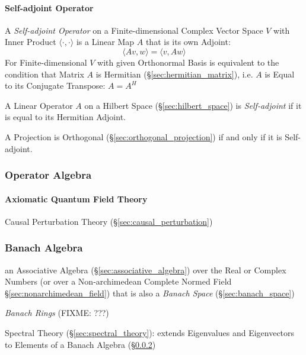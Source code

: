 \paragraph{Self-adjoint Operator}\label{sec:self_adjoint_operator}\hfill

A \emph{Self-adjoint Operator} on a Finite-dimensional Complex Vector Space $V$
with Inner Product $\langle{\cdot, \cdot}\rangle$ is a Linear Map $A$ that is
its own Adjoint:
\[
  \langle{Av,w}\rangle = \langle{v,Aw}\rangle
\]
For Finite-dimensional $V$ with given Orthonormal Basis is equivalent to the
condition that Matrix $A$ is Hermitian (\S\ref{sec:hermitian_matrix}), i.e. $A$
is Equal to its Conjugate Transpose: $A = A^H$

A Linear Operator $A$ on a Hilbert Space (\S\ref{sec:hilbert_space}) is
\emph{Self-adjoint} if it is equal to its Hermitian Adjoint.

A Projection is Orthogonal (\S\ref{sec:orthogonal_projection}) if and only if
it is Self-adjoint.



\subsubsection{Operator Algebra}\label{sec:operator_algebra}

\paragraph{Axiomatic Quantum Field Theory}\label{sec:axiomatic_qft}\hfill

Causal Perturbation Theory (\S\ref{sec:causal_perturbation})



\subsubsection{Banach Algebra}\label{sec:banach_algebra}

an Associative Algebra (\S\ref{sec:associative_algebra}) over the Real or
Complex Numbers (or over a Non-archimedean Complete Normed Field
\S\ref{sec:nonarchimedean_field}) that is also a \emph{Banach Space}
(\S\ref{sec:banach_space})

\emph{Banach Rings} (FIXME: ???)

\fist Spectral Theory (\S\ref{sec:spectral_theory}): extends Eigenvalues and
Eigenvectors to Elements of a Banach Algebra (\S\ref{sec:banach_algebra})



